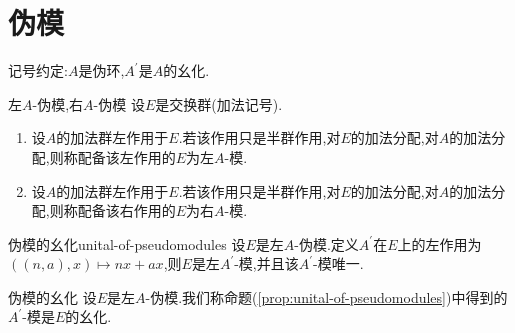 \section{伪模}

记号约定:$A$是伪环,$A^{\prime}$是$A$的幺化.

\begin{definition}{左$A$-伪模,右$A$-伪模}{}
	设$E$是交换群(加法记号).
	\begin{enumerate}
		\item 设$A$的加法群左作用于$E$.若该作用只是半群作用,对$E$的加法分配,对$A$的加法分配,则称配备该左作用的$E$为左$A$-模.
		\item 设$A$的加法群左作用于$E$.若该作用只是半群作用,对$E$的加法分配,对$A$的加法分配,则称配备该右作用的$E$为右$A$-模.
	\end{enumerate}
\end{definition}

\begin{proposition}{伪模的幺化}{unital-of-pseudomodules}
	设$E$是左$A$-伪模.定义$A^{\prime}$在$E$上的左作用为$\left(\left(n,a\right),x\right)\mapsto nx+ax$,则$E$是左$A^{\prime}$-模,并且该$A^{\prime}$-模唯一.
\end{proposition}

\begin{definition}{伪模的幺化}{}
	设$E$是左$A$-伪模.我们称命题(\cref{prop:unital-of-pseudomodules})中得到的$A^{\prime}$-模是$E$的幺化.
\end{definition}





















